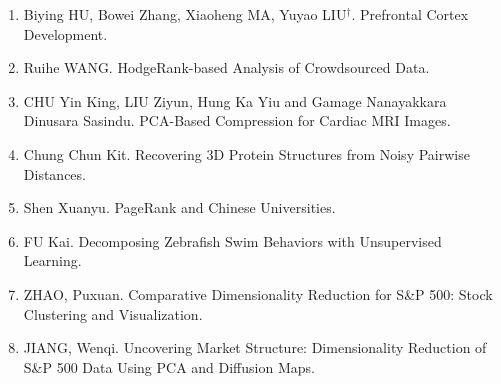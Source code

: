 \documentclass[11pt]{article}
\begin{document}
\begin{enumerate}
\item Biying HU, Bowei Zhang, Xiaoheng MA, Yuyao LIU$^\dagger$. Prefrontal Cortex Development. \\
\item Ruihe WANG. HodgeRank-based Analysis of Crowdsourced Data. \\
\item CHU Yin King, LIU Ziyun, Hung Ka Yiu and Gamage Nanayakkara Dinusara Sasindu. PCA-Based Compression for Cardiac MRI Images. \\
\item Chung Chun Kit. Recovering 3D Protein Structures from Noisy Pairwise Distances. \\
\item Shen Xuanyu. PageRank and Chinese Universities. \\
\item FU Kai. Decomposing Zebrafish Swim Behaviors with Unsupervised Learning. \\
\item ZHAO, Puxuan. Comparative Dimensionality Reduction for S\&P 500: Stock Clustering and Visualization. \\
\item JIANG, Wenqi. Uncovering Market Structure: Dimensionality Reduction of S\&P 500 Data Using PCA and Diffusion Maps. 
\end{enumerate}

%
%
%
\end{document}
